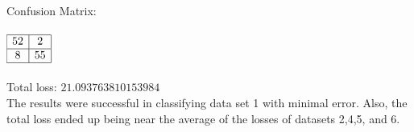 \begin{enumerate}
\begin{enumerate}
					\textnormal{Confusion Matrix: } \\ \\
					\( 
						\begin{array}{|c|c|}
							\hline
							52 & 2 \\
							\hline							
							8 & 55 \\
							\hline
						\end{array}
					\) \\ \\

					Total loss: \(21.093763810153984\) \\
					
					\textnormal{The results were successful in classifying data set 1 with minimal error.  Also, the total loss ended up being near the average of the losses of datasets 2,4,5, and 6.}
			\end{enumerate}
\end{enumerate}


